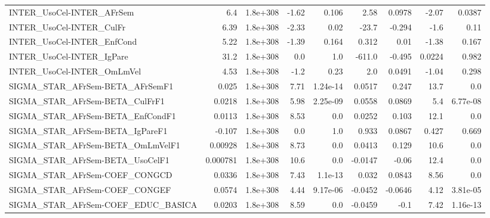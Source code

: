 \begin{tabular}{lrrrrrrrr}
INTER\_UsoCel-INTER\_AFrSem             &         6.4 &     1.8e+308 &   -1.62 &    0.106 &       2.58 &      0.0978 &        -2.07 &        0.0387 \\
INTER\_UsoCel-INTER\_CulFr              &        6.39 &     1.8e+308 &   -2.33 &     0.02 &      -23.7 &      -0.294 &         -1.6 &          0.11 \\
INTER\_UsoCel-INTER\_EnfCond            &        5.22 &     1.8e+308 &   -1.39 &    0.164 &      0.312 &        0.01 &        -1.38 &         0.167 \\
INTER\_UsoCel-INTER\_IgPare             &        31.2 &     1.8e+308 &     0.0 &      1.0 &     -611.0 &      -0.495 &       0.0224 &         0.982 \\
INTER\_UsoCel-INTER\_OmLmVel            &        4.53 &     1.8e+308 &    -1.2 &     0.23 &        2.0 &      0.0491 &        -1.04 &         0.298 \\
SIGMA\_STAR\_AFrSem-BETA\_AFrSemF1       &       0.025 &     1.8e+308 &    7.71 & 1.24e-14 &     0.0517 &       0.247 &         13.7 &           0.0 \\
SIGMA\_STAR\_AFrSem-BETA\_CulFrF1        &      0.0218 &     1.8e+308 &    5.98 & 2.25e-09 &     0.0558 &      0.0869 &          5.4 &      6.77e-08 \\
SIGMA\_STAR\_AFrSem-BETA\_EnfCondF1      &      0.0113 &     1.8e+308 &    8.53 &      0.0 &     0.0252 &       0.103 &         12.1 &           0.0 \\
SIGMA\_STAR\_AFrSem-BETA\_IgPareF1       &      -0.107 &     1.8e+308 &     0.0 &      1.0 &      0.933 &      0.0867 &        0.427 &         0.669 \\
SIGMA\_STAR\_AFrSem-BETA\_OmLmVelF1      &     0.00928 &     1.8e+308 &    8.73 &      0.0 &     0.0413 &       0.129 &         10.6 &           0.0 \\
SIGMA\_STAR\_AFrSem-BETA\_UsoCelF1       &    0.000781 &     1.8e+308 &    10.6 &      0.0 &    -0.0147 &       -0.06 &         12.4 &           0.0 \\
SIGMA\_STAR\_AFrSem-COEF\_CONGCD         &      0.0336 &     1.8e+308 &    7.43 &  1.1e-13 &      0.032 &      0.0843 &         8.56 &           0.0 \\
SIGMA\_STAR\_AFrSem-COEF\_CONGEF         &      0.0574 &     1.8e+308 &    4.44 & 9.17e-06 &    -0.0452 &     -0.0646 &         4.12 &      3.81e-05 \\
SIGMA\_STAR\_AFrSem-COEF\_EDUC\_BASICA    &      0.0203 &     1.8e+308 &    8.59 &      0.0 &    -0.0459 &        -0.1 &         7.42 &      1.16e-13 \\

\end{tabular}
